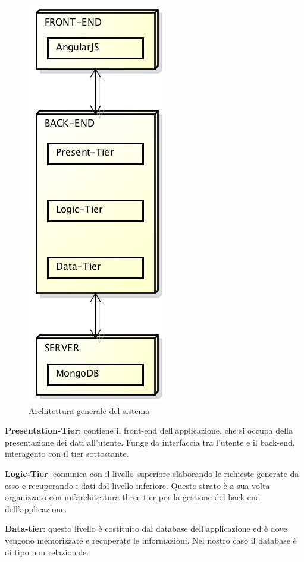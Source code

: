 \begin{figure}[h]
	\centering
	\includegraphics[height=0.6\textheight]{img/architettura_generale}
	\caption[Architettura generale del sistema]{Architettura generale del sistema}
\end{figure}

\textbf{Presentation-Tier}: contiene il front-end dell'applicazione, che si occupa della presentazione dei dati all'utente. Funge da interfaccia tra l'utente e il back-end, interagento con il tier sottostante.

\textbf{Logic-Tier}: comunica con il livello superiore elaborando le richieste generate da esso e recuperando i dati dal livello inferiore. Questo strato è a sua volta organizzato con un'architettura three-tier per la gestione del back-end dell'applicazione.

\textbf{Data-tier}: questo livello è costituito dal database dell'applicazione ed è dove vengono memorizzate e recuperate le informazioni. Nel nostro caso il database è di tipo non relazionale.